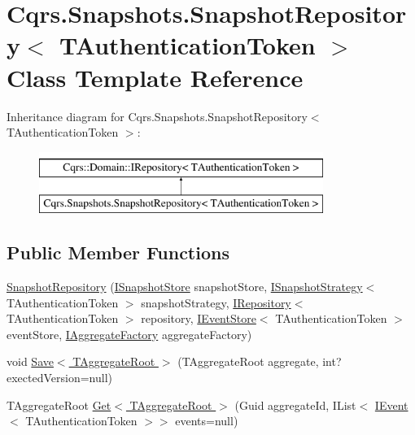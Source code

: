 \hypertarget{classCqrs_1_1Snapshots_1_1SnapshotRepository}{}\section{Cqrs.\+Snapshots.\+Snapshot\+Repository$<$ T\+Authentication\+Token $>$ Class Template Reference}
\label{classCqrs_1_1Snapshots_1_1SnapshotRepository}
Inheritance diagram for Cqrs.\+Snapshots.\+Snapshot\+Repository$<$ T\+Authentication\+Token $>$\+:\begin{figure}[H]
\begin{center}
\leavevmode
\includegraphics[height=2.000000cm]{classCqrs_1_1Snapshots_1_1SnapshotRepository}
\end{center}
\end{figure}
\subsection*{Public Member Functions}
\begin{DoxyCompactItemize}
\item 
\hyperlink{classCqrs_1_1Snapshots_1_1SnapshotRepository_acb079e402392fd79028ddc058ac8344c_acb079e402392fd79028ddc058ac8344c}{Snapshot\+Repository} (\hyperlink{interfaceCqrs_1_1Snapshots_1_1ISnapshotStore}{I\+Snapshot\+Store} snapshot\+Store, \hyperlink{interfaceCqrs_1_1Snapshots_1_1ISnapshotStrategy}{I\+Snapshot\+Strategy}$<$ T\+Authentication\+Token $>$ snapshot\+Strategy, \hyperlink{interfaceCqrs_1_1Domain_1_1IRepository}{I\+Repository}$<$ T\+Authentication\+Token $>$ repository, \hyperlink{interfaceCqrs_1_1Events_1_1IEventStore}{I\+Event\+Store}$<$ T\+Authentication\+Token $>$ event\+Store, \hyperlink{interfaceCqrs_1_1Domain_1_1Factories_1_1IAggregateFactory}{I\+Aggregate\+Factory} aggregate\+Factory)
\item 
void \hyperlink{classCqrs_1_1Snapshots_1_1SnapshotRepository_a4a7484e7754cae876f0c04e640eb80ff_a4a7484e7754cae876f0c04e640eb80ff}{Save$<$ T\+Aggregate\+Root $>$} (T\+Aggregate\+Root aggregate, int? exected\+Version=null)
\item 
T\+Aggregate\+Root \hyperlink{classCqrs_1_1Snapshots_1_1SnapshotRepository_acdbea47afc87de1da613a6eff3ceef0f_acdbea47afc87de1da613a6eff3ceef0f}{Get$<$ T\+Aggregate\+Root $>$} (Guid aggregate\+Id, I\+List$<$ \hyperlink{interfaceCqrs_1_1Events_1_1IEvent}{I\+Event}$<$ T\+Authentication\+Token $>$$>$ events=null)
\end{DoxyCompactItemize}


